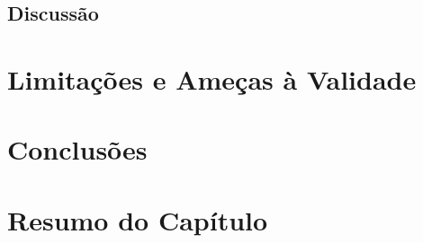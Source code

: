 \subsection{Discussão}
\label{sub:implemtacao_extensao_avaliacao_discussao}

\section{Limitações e Ameças à Validade}
\label{sec:limitações_e_ameças_à_validade}

\section{Conclusões}
\label{sec:conclusões}

\section{Resumo do Capítulo}
\label{sec:implemtacao_extensao_resumo}
